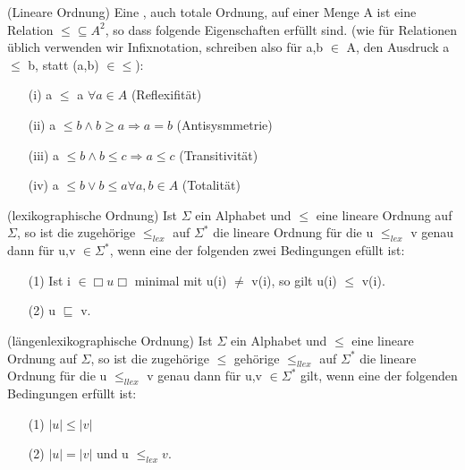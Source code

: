 \documentclass[a4paper]{article}
\begin{document}
\begin{DefBox}{(Lineare Ordnung)}
 Eine , auch totale Ordnung, auf einer Menge A ist eine Relation $\leq \subseteq A^2$, so dass folgende Eigenschaften erfüllt sind. (wie für Relationen üblich verwenden wir Infixnotation, schreiben also für a,b $\in$ A, den Ausdruck a $\leq$ b, statt (a,b) $\in \leq$):
 \begin{itemize}
  \item[(i)] a $\leq$ a $\forall a \in A$ (Reflexifität)
  \item[(ii)] a $\leq b \wedge b \geq a \Rightarrow a = b$ (Antisysmmetrie)
  \item[(iii)] a $\leq b \wedge b \leq c \Rightarrow a \leq c$ (Transitivität)
  \item[(iv)] a $\leq b \vee b \leq a \forall a,b \in A$ (Totalität)
\end{itemize}
\end{DefBox}

\begin{DefBox}{(lexikographische Ordnung)}
 Ist $\Sigma$ ein Alphabet und $\leq$ eine lineare Ordnung auf $\Sigma$, so ist die zugehörige  $\leq_{lex}$ auf $\Sigma^*$ die lineare Ordnung für die u $\leq_{lex}$ v genau dann für u,v $\in \Sigma^*$, wenn eine der folgenden zwei Bedingungen efüllt ist:
 \begin{itemize}
  \item[(1)] Ist i $\in \Box u \Box$ minimal mit u(i) $\neq$ v(i), so gilt u(i) $\leq$ v(i).
  \item[(2)] u $\sqsubseteq$ v.
 \end{itemize}
\end{DefBox}

\begin{DefBox}{(längenlexikographische Ordnung)}
 Ist $\Sigma$ ein Alphabet und $\leq$ eine lineare Ordnung auf $\Sigma$, so ist die zugehörige $\leq$ gehörige  $\leq_{llex}$ auf $\Sigma^*$ die lineare Ordnung für die u $\leq_{llex}$ v genau dann für u,v $\in \Sigma^*$ gilt, wenn eine der folgenden Bedingungen erfüllt ist:
 \begin{itemize}
  \item[(1)] $|u| \leq |v|$
  \item[(2)] $|u| = |v|$ und u $\leq_{lex} v$.
 \end{itemize}
\end{DefBox}
\end{document}
